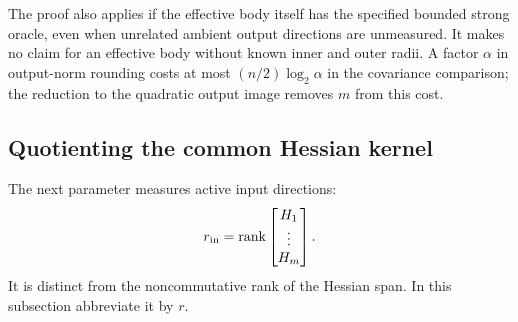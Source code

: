 The proof also applies if the effective body itself has the specified
bounded strong oracle, even when unrelated ambient output directions
are unmeasured. It makes no claim for an effective body without known
inner and outer radii. A factor $\alpha$ in output-norm rounding costs
at most $(n/2)\log_2\alpha$ in the covariance comparison; the reduction
to the quadratic output image removes $m$ from this cost.

\subsection{Quotienting the common Hessian kernel}

The next parameter measures active input directions:
\[
 r_{\rm in}=\operatorname{rank}\begin{bmatrix}H_1\\ \vdots\\H_m\end{bmatrix}.
\]
It is distinct from the noncommutative rank of the Hessian span. In this
subsection abbreviate it by $r$.

